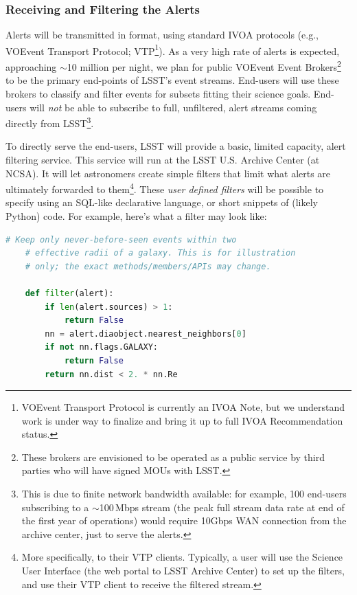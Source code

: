 \documentclass[SE,lsstdraft,toc]{lsstdoc}
\begin{document}
\subsubsection{Receiving and Filtering the Alerts}
\label{sec:eventbrokers}

Alerts will be transmitted in \VOEvent format, using standard IVOA protocols (e.g., VOEvent Transport Protocol; VTP\footnote{VOEvent Transport Protocol is currently an IVOA Note, but we understand work is under way to finalize and bring it up to full IVOA Recommendation status.}). As a very high rate of alerts is expected, approaching $\sim$10 million per night, we plan for public VOEvent Event Brokers\footnote{These brokers are envisioned to be operated as a public service by third parties who will have signed MOUs with LSST.} to be the primary end-points of LSST's event streams. End-users will use these brokers to classify and filter events for subsets fitting their science goals. End-users will \emph{not} be able to subscribe to full, unfiltered, alert streams coming directly from LSST\footnote{This is due to finite network bandwidth available: for example, 100 end-users subscribing to a $\sim$100\,Mbps stream (the peak full stream data rate at end of the first year of operations) would require 10Gbps WAN connection from the archive center, just to serve the alerts.}.

To directly serve the end-users, LSST will provide a basic, limited capacity, alert filtering service. This service will run at the LSST U.S. Archive Center (at NCSA). It will let astronomers create simple filters that limit what alerts are ultimately forwarded to them\footnote{More specifically, to their VTP clients. Typically, a user will use the Science User Interface (the web portal to LSST Archive Center) to set up the filters, and use their VTP client to receive the filtered \VOEvent stream.}. These \emph{user defined filters} will be possible to specify using an SQL-like declarative language, or short snippets of (likely Python) code. For example, here's what a filter may look like:

\begin{lstlisting}[language=python,commentstyle=\bfseries\color{green!40!black}]
    # Keep only never-before-seen events within two
    # effective radii of a galaxy. This is for illustration
    # only; the exact methods/members/APIs may change.

    def filter(alert):
        if len(alert.sources) > 1:
            return False
        nn = alert.diaobject.nearest_neighbors[0]
        if not nn.flags.GALAXY:
            return False
        return nn.dist < 2. * nn.Re
\end{lstlisting}
\end{document}
